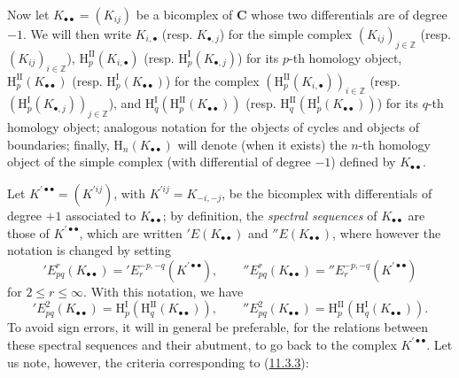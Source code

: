 \begin{env}[11.3.5]
\label{0.11.3.5}
Now let $K_{\bullet\bullet}=(K_{ij})$ be a bicomplex of
$\boldsymbol{C}$ whose two differentials are of degree $-1$. We
will then write $K_{i,\bullet}$ (resp. $K_{\bullet,j}$) for the simple complex
$(K_{ij})_{j\in\mathbb Z}$ (resp. $(K_{ij})_{i\in\mathbb Z}$),
$\mathrm H_p^{\mathrm{II}}(K_{i,\bullet})$ (resp.
$\mathrm H_p^{\mathrm I}(K_{\bullet,j})$) for its $p$-th homology object,
$\mathrm H_p^{\mathrm{II}}(K_{\bullet\bullet})$ (resp.
$\mathrm H_p^{\mathrm I}(K_{\bullet\bullet})$) for the complex
$(\mathrm H_p^{\mathrm{II}}(K_{i,\bullet}))_{i\in\mathbb Z}$ (resp.
$(\mathrm H_p^{\mathrm I}(K_{\bullet,j}))_{j\in\mathbb Z}$), and
$\mathrm H_q^{\mathrm I}(\mathrm H_p^{\mathrm{II}}(K_{\bullet\bullet}))$
(resp.
$\mathrm H_q^{\mathrm{II}}(\mathrm H_p^{\mathrm I}(K_{\bullet\bullet}))$)
for its $q$-th homology object; analogous notation for the objects of cycles
and objects of boundaries; finally, $\mathrm H_n(K_{\bullet\bullet})$ will denote
(when it exists) the $n$-th homology object of the simple complex (with
differential of degree $-1$) defined by $K_{\bullet\bullet}$.

Let $K^{\prime\bullet\bullet}=(K^{\prime ij})$, with
$K^{\prime ij}=K_{-i,-j}$, be the bicomplex with differentials of degree
$+1$ associated to $K_{\bullet\bullet}$; by definition, the
\emph{spectral sequences} of $K_{\bullet\bullet}$ are those of
$K^{\prime\bullet\bullet}$, which are written $'E(K_{\bullet\bullet})$ and
$''E(K_{\bullet\bullet})$, where however the notation is changed by
setting
\[
  'E_{pq}^r(K_{\bullet\bullet})
  ='E_r^{-p,-q}(K^{\prime\bullet\bullet}),\qquad
  ''E_{pq}^r(K_{\bullet\bullet})
  =''E_r^{-p,-q}(K^{\prime\bullet\bullet})
\]
for $2\leq r\leq\infty$. With this notation, we have
\[
  'E_{pq}^2(K_{\bullet\bullet})
  =\mathrm H_p^{\mathrm I}(\mathrm H_q^{\mathrm{II}}(K_{\bullet\bullet})),
  \qquad
  ''E_{pq}^2(K_{\bullet\bullet})
  =\mathrm H_p^{\mathrm{II}}(\mathrm H_q^{\mathrm I}(K_{\bullet\bullet})).
\]
To avoid sign errors, it will in general be preferable, for the
relations between these spectral sequences and their abutment, to go back to the
complex $K^{\prime\bullet\bullet}$. Let us note, however, the criteria
corresponding to (\hyperref[0.11.3.3]{11.3.3}):
\end{env}

